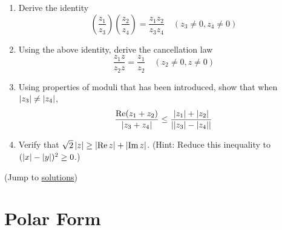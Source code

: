 \documentclass[11pt, oneside]{book}
\begin{document}
\begin{enumerate}
	\item Derive the identity
	\begin{equation*}
		\left( \frac{z_1}{z_3} \right)\left( \frac{z_2}{z_4} \right) = \frac{z_1 z_2}{z_3 z_4} \quad (z_3 \neq 0, z_4 \neq 0)
	\end{equation*}

	\item Using the above identity, derive the cancellation law
	\begin{equation*}
		\frac{z_1 z}{z_2 z} = \frac{z_1}{z_2} \quad (z_2 \neq 0, z \neq 0)
	\end{equation*}

	\item Using properties of moduli that has been introduced, show that when $\left|z_3\right| \neq \left|z_4\right|$,
	\begin{equation*}
		\frac{\operatorname{Re}(z_1 + z_2)}{\left|z_3 + z_4\right|} \leq \frac{\left|z_1\right| + \left|z_2\right|}{\left|\left|z_3\right| - \left|z_4\right|\right|} 
	\end{equation*}

	\item Verify that $\sqrt{2}\left|z\right| \geq \left|\operatorname{Re} z\right| + \left|\operatorname{Im} z\right|$. (Hint: Reduce this inequality to $(\left|x\right| - \left|y\right|)^2 \geq 0$.)
\end{enumerate}

(Jump to \hyperref[sub:basic_algebraic_properties]{solutions})


\section{Polar Form} %
\label{sec:polar_form}
\end{document}
